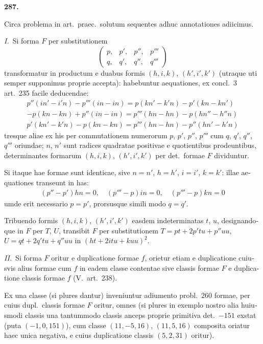 \documentclass[12pt,a4paper]{article}
\theoremstyle{plain}
\theoremstyle{definition}
\theoremstyle{remark}
\begin{document}
\begin{otherlanguage}{latin}
\bigskip

\textbf{287.}

Circa problema in art.\ praec.\ solutum sequentes adhuc annotationes adiicimus.

\textit{I.}\ Si forma $F$ per substitutionem
\[
\begin{pmatrix} p, & p', & p'', & p''' \\ q, & q', & q'', & q''' \end{pmatrix}
\]
transformatur in productum e duabus formis $(h, i, k)$, $(h', i', k')$ (utraque uti semper supponimus proprie accepta): habebuntur aequationes, ex concl.\ 3 art.\ 235 facile deducendae:
\begin{gather*}
p''(in' - i'n) - p'''(in - in) = p(kn' - k'n) - p'(kn - kn') \\
- p(kn - kn) + p''(in - in) = p'''(hn - hn) - p(hn'' - h''n) \\
p'(kn' - k'n) - p(kn - kn) = p'''(hn - hn) - p''(hn' - h'n)
\end{gather*}
tresque aliae ex his per commutationem numerorum $p$, $p'$, $p''$, $p'''$ cum $q$, $q'$, $q''$, $q'''$ oriundae; $n$, $n'$ sunt radices quadratae positivae e quotientibus prodeuntibus, determinantes formarum $(h, i, k)$, $(h', i', k')$ per det.\ formae $F$ dividuntur.

Si itaque hae formae sunt identicae, sive $n = n'$, $h = h'$, $i = i'$, $k = k'$: illae aequationes transeunt in has:
\begin{gather*}
(p'' - p')hn = 0, \quad (p''' - p)in = 0, \quad (p''' - p)kn = 0
\end{gather*}
umde erit necessario $p = p'$, prorsusque simili modo $q = q'$.

Tribuendo formis $(h, i, k)$, $(h', i', k')$ easdem indeterminatas $t$, $u$, designandoque in $F$ per $T$, $U$, transibit $F$ per substitutionem $T = pt + 2p'tu + p''uu$, $U = qt + 2q'tu + q''uu$ in $(ht + 2itu + kuu)^2$.

\textit{II.}\ Si forma $F$ oritur e duplicatione formae $f$, orietur etiam e duplicatione cuiusvis alius formae cum $f$ in eadem classe contentae sive classis formae $F$ e duplicatione classis formae $f$ (V.\ art.\ 238).

Ex una classe (si plures dantur) inveniuntur adiumento probl.\ 260 formae, per cuius dupl.\ classis formae $F$ oritur, omnes (si plures in exemplo nostro alia huiusmodi classis una tantummodo classis anceps proprie primitiva det.\ $-151$ exstat (puta $(-1, 0, 151)$), cum classe $(11, -5, 16)$, $(11, 5, 16)$ composita oriatur haec unica negativa, e cuius duplicatione classis $(5, 2, 31)$ oritur).


\end{otherlanguage}
\end{document}
